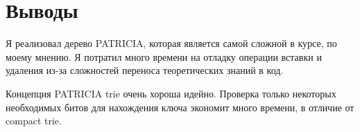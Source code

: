  
\section{Выводы}
Я реализовал дерево PATRICIA, которая является самой сложной в курсе, по моему мнению. Я потратил много времени на отладку операции вставки и удаления из-за сложностей переноса теоретических знаний в код.

Концепция PATRICIA trie очень хороша идейно. Проверка только некоторых необходимых битов для нахождения ключа экономит много времени, в отличие от compact trie.
\pagebreak
